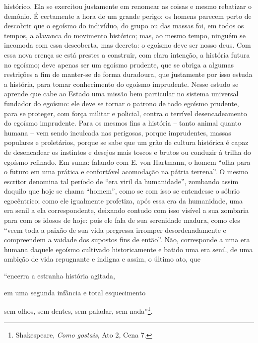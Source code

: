 \begin{enumerate}
\begin{enumerate}
    histórico. Ela se exercitou justamente em renomear as coisas e mesmo
    rebatizar o demônio. É certamente a hora de um grande perigo: os
    homens parecem perto de descobrir que o egoísmo do indivíduo, do
    grupo ou das massas foi, em todos os tempos, a alavanca do movimento
    histórico; mas, ao mesmo tempo, ninguém se incomoda com essa
    descoberta, mas decreta: o egoísmo deve ser nosso deus. Com essa
    nova crença se está prestes a construir, com clara intenção, a
    história futura no egoísmo; deve apenas ser um egoísmo prudente, que
    se obriga a algumas restrições a fim de manter-se de forma
    duradoura, que justamente por isso estuda a história, para tomar
    conhecimento do egoísmo imprudente. Nesse estudo se aprende que cabe
    ao Estado uma missão bem particular no sistema universal fundador do
    egoísmo: ele deve se tornar o patrono de todo egoísmo prudente, para
    se proteger, com força militar e policial, contra o terrível
    desencadeamento do egoísmo imprudente. Para os mesmos fins a
    história -- tanto animal quanto humana -- vem sendo inculcada nas
    perigosas, porque imprudentes, massas populares e proletários,
    porque se sabe que um grão de cultura histórica é capaz de
    desencadear os instintos e desejos mais toscos e brutos ou conduzir
    à trilha do egoísmo refinado. Em suma: falando com E. von Hartmann,
    o homem ``olha para o futuro em uma prática e confortável acomodação
    na pátria terrena''. O mesmo escritor denomina tal período de ``era
    viril da humanidade'', zombando assim daquilo que hoje se chama
    ``homem'', como se com isso se entendesse o sóbrio egocêntrico; como
    ele igualmente profetiza, após essa era da humanidade, uma era senil
    a ela correspondente, deixando contudo com isso visível a sua
    zombaria para com os idosos de hoje: pois ele fala de sua serenidade
    madura, como eles ``veem toda a paixão de sua vida pregressa
    irromper desordenadamente e compreendem a vaidade dos supostos fins
    de então''. Não, corresponde a uma era humana daquele egoísmo
    cultivado historicamente e batido uma era senil, de uma ambição de
    vida repugnante e indigna e assim, o último ato, que
  \end{enumerate}
\end{enumerate}

``encerra a estranha história agitada,

em uma segunda infância e total esquecimento

sem olhos, sem dentes, sem paladar, sem nada''\footnote{Shakespeare,
  \emph{Como gostais}, Ato 2, Cena 7.}.

